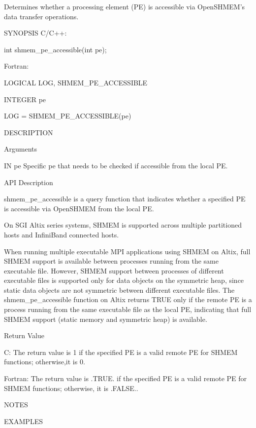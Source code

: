        Determines whether a processing element (PE) is accessible via OpenSHMEM's data transfer operations.

SYNOPSIS
       C/C++:

	  int shmem_pe_accessible(int pe);

       Fortran:

	  LOGICAL LOG, SHMEM_PE_ACCESSIBLE

	  INTEGER pe

	  LOG = SHMEM_PE_ACCESSIBLE(pe)

DESCRIPTION

Arguments

	IN pe	Specific pe that needs to be checked if accessible from the local PE.

API Description

       shmem_pe_accessible is  a  query	 function  that	 indicates  whether  a
       specified PE is accessible via OpenSHMEM from the local PE.

       On  SGI	Altix  series  systems,	 SHMEM	is  supported  across multiple
       partitioned hosts and InfiniBand connected hosts.

       When running multiple executable MPI applications using SHMEM on Altix,
       full SHMEM support is available between processes running from the same
       executable file.	 However, SHMEM support between processes of different
       executable  files  is  supported only for data objects on the symmetric
       heap, since static data objects are  not	 symmetric  between  different
       executable  files.   The	 shmem_pe_accessible function on Altix returns
       TRUE only if  the  remote  PE  is  a  process  running  from  the  same
       executable  file	 as  the  local PE, indicating that full SHMEM support
       (static memory and symmetric heap) is available.

Return Value

       C:	 The return value is 1 if the specified PE is a	 valid	remote
		 PE for SHMEM functions; otherwise,it is 0.

       Fortran:	 The  return  value  is	 .TRUE. if the specified PE is a valid
		 remote PE for SHMEM functions; otherwise, it is .FALSE..

NOTES

EXAMPLES
